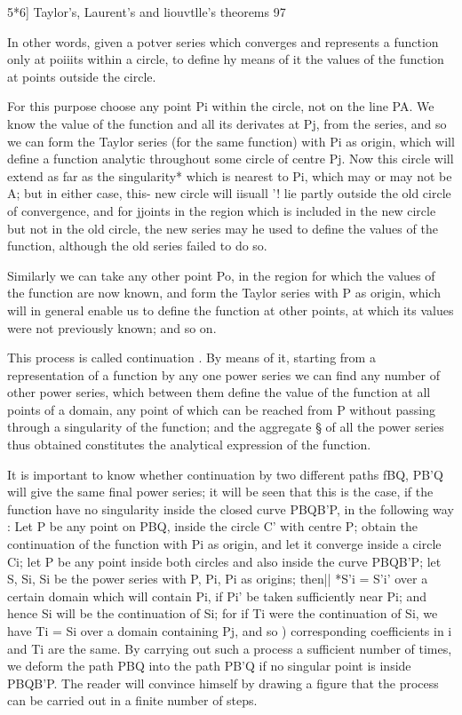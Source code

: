{{5*6] Taylor's, Laurent's and liouvtlle's theorems 97

In other words, given a potver series which converges and represents a
function only at poiiits within a circle, to define hy means of it the
values of the function at points outside the circle.

For this purpose choose any point Pi within the circle, not on the
line PA. We know the value of the function and all its derivates at
Pj, from the series, and so we can form the Taylor series (for the
same function) with Pi as origin, which will define a function
analytic throughout some circle of centre Pj. Now this circle will
extend as far as the singularity* which is nearest to Pi, which may or
may not be A; but in either case, this- new circle will iisuall '!
lie partly outside the old circle of convergence, and for jjoints in
the region which is included in the new circle but not in the old
circle, the new series may he used to define the values of the
function, although the old series failed to do so.

Similarly we can take any other point Po, in the region for which the
values of the function are now known, and form the Taylor series with
P as origin, which will in general enable us to define the function at
other points, at which its values were not previously known; and so
on.

This process is called continuation . By means of it, starting from a
representation of a function by any one power series we can find any
number of other power series, which between them define the value of
the function at all points of a domain, any point of which can be
reached from P without passing through a singularity of the function;
and the aggregate § of all the power series thus obtained constitutes
the analytical expression of the function.

It is important to know whether continuation by two different paths
fBQ, PB'Q will give the same final power series; it will be seen that
this is the case, if the function have no singularity inside the
closed curve PBQB'P, in the following way : Let P be any point on PBQ,
inside the circle C' with centre P; obtain the continuation of the
function with Pi as origin, and let it converge inside a circle Ci;
let P be any point inside both circles and also inside the curve
PBQB'P; let S, Si, Si be the power series with P, Pi, Pi as origins;
then|| *S'i = S'i' over a certain domain which will contain Pi, if Pi'
be taken sufficiently near Pi; and hence Si will be the continuation
of Si; for if Ti were the continuation of Si, we have Ti = Si over a
domain containing Pj, and so ) corresponding coefficients in i
and Ti are the same. By carrying out such a process a sufficient
number of times, we deform the path PBQ into the path PB'Q if no
singular point is inside PBQB'P. The reader will convince himself by
drawing a figure that the process can be carried out in a finite
number of steps.

}}
